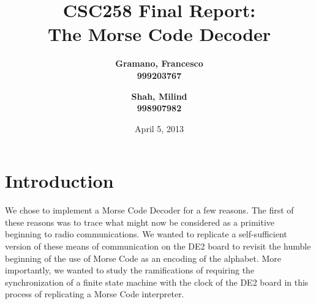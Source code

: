 \documentclass[12pt, letterpaper, english]{article}
\author{
  \textbf{Gramano, Francesco}\\
  \textbf{999203767}\\ %
  \and
  \textbf{Shah, Milind}\\
  \textbf{998907982}\\ %
}
\title{\textbf{CSC258 Final Report:\\ The Morse Code Decoder\\}}
\date{April 5, 2013}
\begin{document}
\maketitle
\section*{Introduction}
\indent\indent We chose to implement a Morse Code Decoder for a few reasons. The first of these reasons was to trace what might now be considered as a primitive beginning to radio communications. We wanted to replicate a self-sufficient version of these means of communication on the DE2 board to revisit the humble beginning of the use of Morse Code as an encoding of the alphabet. More importantly, we wanted to study the ramifications of requiring the synchronization of a finite state machine with the clock of the DE2 board in this process of replicating a Morse Code interpreter.\\
\end{document}
